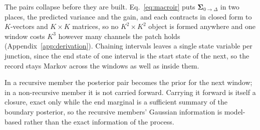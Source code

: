 The pairs collapse before they are built. Eq.~\ref{eq:macroir} puts
$\boldsymbol{\Sigma}_{0\to\Delta}$ in two places, the predicted variance and the gain, and each contracts
in closed form to $K$-vectors and $K\times K$ matrices, so no $K^2\times K^2$ object is formed
anywhere and one window costs $K^3$ however many channels the patch holds
(Appendix~\ref{app:derivation}). Chaining intervals leaves a single state variable per junction,
since the end state of one interval is the start state of the next, so the record stays Markov
across the windows as well as inside them.

In a recursive member the posterior pair becomes the prior for the next window; in a non-recursive
member it is not carried forward. Carrying it forward is itself a closure, exact only while the end
marginal is a sufficient summary of the boundary posterior, so the recursive members' Gaussian
information is model-based rather than the exact information of the process.

